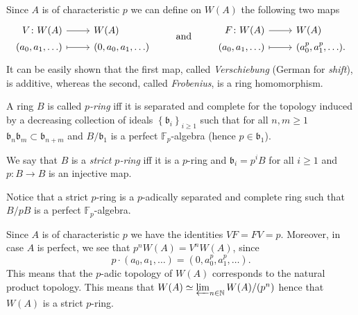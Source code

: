 \begin{defn}
	Since $A$ is of characteristic $p$ we can define on $W(A)$ the following two
	maps
	\begin{equation*}
	\begin{tikzcd}[row sep = 0ex
		,/tikz/column 1/.append style={anchor=base east}
		,/tikz/column 2/.append style={anchor=base west}]
		V\colon W(A) \arrow[r, "", rightarrow] &
		W(A) \\
		(a_0, a_1, \ldots) \arrow[r, "", mapsto] & 
		(0, a_0, a_1, \ldots)
	\end{tikzcd}
	\qquad \text{ and } \qquad
	\begin{tikzcd}[row sep = 0ex
		,/tikz/column 1/.append style={anchor=base east}
		,/tikz/column 2/.append style={anchor=base west}]
		F\colon W(A) \arrow[r, "", rightarrow] &
		W(A) \\
		(a_0, a_1, \ldots) \arrow[r, "", mapsto] & 
		(a_0^p, a_1^p, \ldots)
	.\end{tikzcd}
	\end{equation*} 
	It can be easily shown that the first map, called {\em Verschiebung}
	(German for {\em shift}), is additive, whereas the second, called {\em Frobenius},
	is a ring homomorphism.
\end{defn}


\begin{defn}[]
	A ring $B$ is called {\em $p$-ring} iff it is separated and complete
	for the topology induced by a decreasing collection of ideals
	$\left\{ \mathfrak{b}_i \right\}_{i \geq 1}$ such that for all $n,m \geq 1$
	$\mathfrak{b}_n \mathfrak{b}_m \subset \mathfrak{b}_{n+m}$ and
	$B/\mathfrak{b}_1$ is a perfect $\mathbb{F}_p$-algebra
	(hence $p \in \mathfrak{b}_1$).

	We say that $B$ is a {\em strict $p$-ring} iff it is a $p$-ring
	and $\mathfrak{b}_i = p^iB$ for all $i \geq 1$
	and $p\colon B \to B$ is an injective map.
\end{defn}


\begin{rem}[]
	Notice that a strict $p$-ring is a $p$-adically separated and complete
	ring such that $B/pB$ is a perfect $\mathbb{F}_p$-algebra.
\end{rem}


\begin{rem}[]
	Since $A$ is of characteristic $p$ we have the identities
	$VF = FV = p$.
	Moreover, in case $A$ is perfect, we see that $p^nW(A) = V^nW(A)$,
	since
	\begin{equation*}
		p \cdot \left( a_0, a_1, \ldots \right) =
		(0, a_0^p, a_1^p, \ldots)
	.\end{equation*}
	This means that the $p$-adic topology of $W(A)$ corresponds
	to the natural product topology.
	This means that $W(A) \simeq \varprojlim_{n \in \mathbb{N}} W(A)/ (p^n)$
	hence that $W(A)$ is a strict $p$-ring.
\end{rem}



